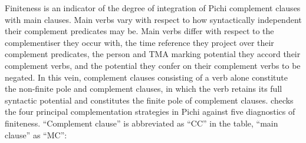 Finiteness is an indicator of the degree of integration of Pichi complement clauses with main clauses. Main verbs vary with respect to how syntactically independent their complement predicates may be. Main verbs differ with respect to the complementiser they occur with, the time reference they project over their complement predicates, the person and TMA marking potential they accord their complement verbs, and the potential they confer on their complement verbs to be negated. In this vein, complement clauses consisting of a verb alone constitute the non-finite pole and complement clauses, in which the verb retains its full syntactic potential and constitutes the finite pole of complement clauses.  checks the four principal complementation strategies in Pichi against five diagnostics of finiteness. “Complement clause” is abbreviated as “CC” in the table, “main clause” as “MC”:

